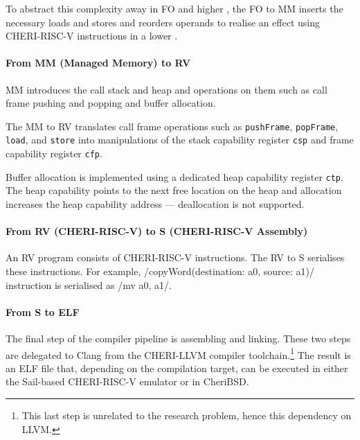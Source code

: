 \documentclass[main.tex]{subfiles}
\begin{document}
To abstract this complexity away in FO and higher , the FO to MM  inserts the necessary loads and stores and reorders operands to realise an effect using CHERI-RISC-V instructions in a lower .

\paragraph{From MM (Managed Memory) to RV} MM introduces the call stack and heap and operations on them such as call frame pushing and popping and buffer allocation.

The MM to RV  translates call frame operations such as \texttt{pushFrame}, \texttt{popFrame}, \texttt{load}, and \texttt{store} into manipulations of the stack capability register \texttt{csp} and frame capability register \texttt{cfp}.

Buffer allocation is implemented using a dedicated heap capability register \texttt{ctp}. The heap capability points to the next free location on the heap and allocation increases the heap capability address — deallocation is not supported.

\paragraph{From RV (CHERI-RISC-V) to S (CHERI-RISC-V Assembly)} An RV program consists of CHERI-RISC-V instructions. The RV to S  serialises these instructions. For example, \iil/copyWord(destination: a0, source: a1)/ instruction is serialised as \irv/mv a0, a1/.

\paragraph{From S to ELF} The final step of the compiler pipeline is assembling and linking. These two steps are delegated to Clang from the CHERI-LLVM compiler toolchain.\footnote{This last step is unrelated to the research problem, hence this dependency on LLVM.} The result is an ELF file that, depending on the compilation target, can be executed in either the Sail-based CHERI-RISC-V emulator or in CheriBSD.

\biblio{}
\onlyinsubfile{\glsaddall\printglossaries}
\end{document}
